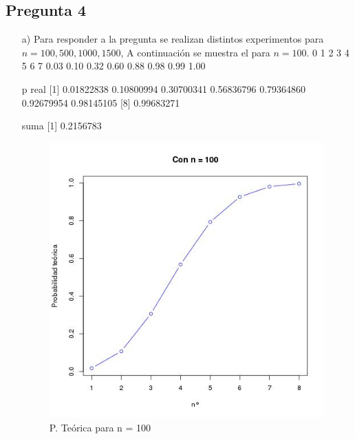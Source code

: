 \documentclass[letter,10pt]{article}
\begin{document}
\subsection{Pregunta 4}
\begin{itemize}
 \item[a)] Para responder a la pregunta se realizan distintos experimentos para $n= 100,500,1000,1500$, A continuación se muestra el para $n=100$.
    0    1    2    3    4    5    6    7 
0.03 0.10 0.32 0.60 0.88 0.98 0.99 1.00 

 p real
[1] 0.01822838 0.10800994 0.30700341 0.56836796 0.79364860 0.92679954 0.98145105
[8] 0.99683271

suma [1] 0.2156783
  \begin{minipage}{\linewidth}
      \centering
      \begin{minipage}{0.45\linewidth}
          \begin{figure}[H]
              \includegraphics[width=\linewidth]{p3_teo_100.jpg}
              \caption{P. Te\'orica para n = 100}
          \end{figure}
      \end{minipage}
      \hspace{0.05\linewidth}
      \begin{minipage}{0.45\linewidth}
          \begin{figure}[H]

\end{figure}
\end{minipage}
\end{minipage}
\end{itemize}
\end{document}

